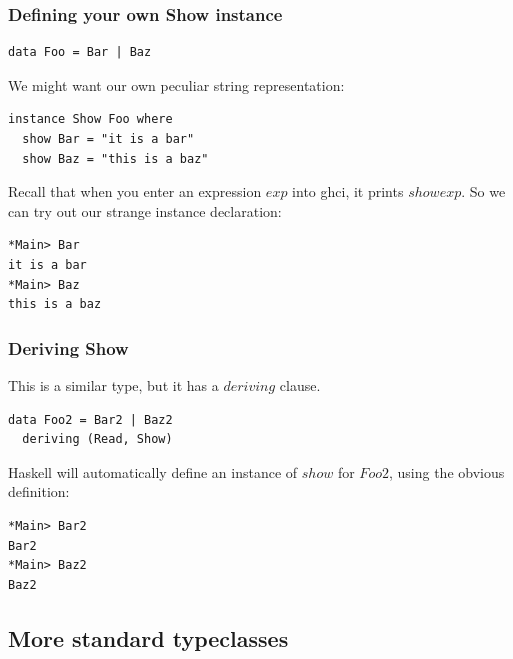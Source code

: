 \documentclass{beamer}
\begin{document}
\begin{frame}[fragile]
\frametitle{Defining your own Show instance}

\begin{verbatim}
data Foo = Bar | Baz
\end{verbatim}

We might want our own peculiar string representation:

\begin{verbatim}
instance Show Foo where
  show Bar = "it is a bar"
  show Baz = "this is a baz"
\end{verbatim}

Recall that when you enter an expression $exp$ into ghci, it prints
$show exp$.  So we can try out our strange instance declaration:

\begin{verbatim}
*Main> Bar
it is a bar
*Main> Baz
this is a baz
\end{verbatim}

\end{frame}

\begin{frame}[fragile]
\frametitle{Deriving Show}

This is a similar type, but it has a $deriving$ clause.

\begin{verbatim}
data Foo2 = Bar2 | Baz2
  deriving (Read, Show)
\end{verbatim}

Haskell will automatically define an instance of $show$ for $Foo2$,
using the obvious definition:

\begin{verbatim}
*Main> Bar2
Bar2
*Main> Baz2
Baz2
\end{verbatim}

\end{frame}

\subsection{More standard typeclasses}
\end{document}

